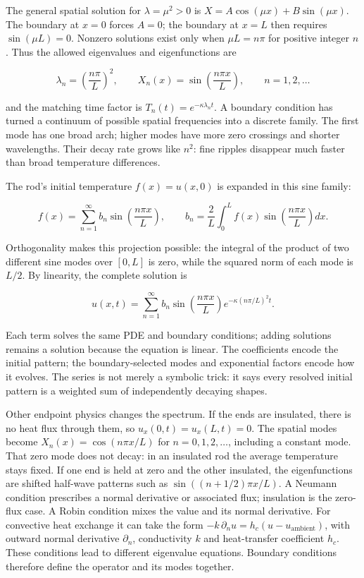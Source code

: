 The general spatial solution for \(\lambda=\mu^2>0\) is \(X=A\cos(\mu x)+B\sin(\mu x)\). The boundary at \(x=0\) forces \(A=0\); the boundary at \(x=L\) then requires \(\sin(\mu L)=0\). Nonzero solutions exist only when \(\mu L=n\pi\) for positive integer \(n\). Thus the allowed eigenvalues and eigenfunctions are

\[
\lambda_n=\left(\frac{n\pi}{L}\right)^2,
\qquad
X_n(x)=\sin\left(\frac{n\pi x}{L}\right),
\qquad n=1,2,\ldots
\]

and the matching time factor is \(T_n(t)=e^{-\kappa\lambda_nt}\). A boundary condition has turned a continuum of possible spatial frequencies into a discrete family. The first mode has one broad arch; higher modes have more zero crossings and shorter wavelengths. Their decay rate grows like \(n^2\): fine ripples disappear much faster than broad temperature differences.

The rod's initial temperature \(f(x)=u(x,0)\) is expanded in this sine family:

\[
f(x)=\sum_{n=1}^{\infty}b_n\sin\left(\frac{n\pi x}{L}\right),
\qquad
b_n=\frac{2}{L}\int_0^L f(x)\sin\left(\frac{n\pi x}{L}\right)dx.
\]

Orthogonality makes this projection possible: the integral of the product of two different sine modes over \([0,L]\) is zero, while the squared norm of each mode is \(L/2\). By linearity, the complete solution is

\[
u(x,t)=\sum_{n=1}^{\infty}b_n\sin\left(\frac{n\pi x}{L}\right)e^{-\kappa(n\pi/L)^2t}.
\]

Each term solves the same PDE and boundary conditions; adding solutions remains a solution because the equation is linear. The coefficients encode the initial pattern; the boundary-selected modes and exponential factors encode how it evolves. The series is not merely a symbolic trick: it says every resolved initial pattern is a weighted sum of independently decaying shapes.

Other endpoint physics changes the spectrum. If the ends are insulated, there is no heat flux through them, so \(u_x(0,t)=u_x(L,t)=0\). The spatial modes become \(X_n(x)=\cos(n\pi x/L)\) for \(n=0,1,2,\ldots\), including a constant mode. That zero mode does not decay: in an insulated rod the average temperature stays fixed. If one end is held at zero and the other insulated, the eigenfunctions are shifted half-wave patterns such as \(\sin((n+1/2)\pi x/L)\). A Neumann condition prescribes a normal derivative or associated flux; insulation is the zero-flux case. A Robin condition mixes the value and its normal derivative. For convective heat exchange it can take the form \(-k\,\partial_nu=h_c(u-u_{\mathrm{ambient}})\), with outward normal derivative \(\partial_n\), conductivity \(k\) and heat-transfer coefficient \(h_c\). These conditions lead to different eigenvalue equations. Boundary conditions therefore define the operator and its modes together.

